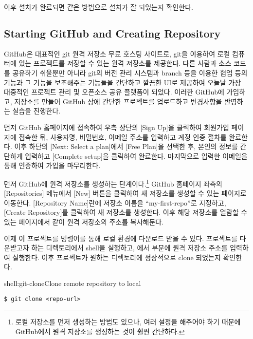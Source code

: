 이후 설치가 완료되면 \과 같은 방법으로 설치가 잘 되었는지 확인한다.
\newpage

\subsection*{Starting GitHub and Creating Repository}

GitHub은 대표적인 git 원격 저장소 무료 호스팅 사이트로, git을 이용하여 로컬 컴퓨터에 있는 프로젝트를 저장할 수 있는 원격 저장소를 제공한다. 다른 사람과 소스 코드를 공유하기 쉬울뿐만 아니라 git의 버전 관리 시스템과 branch 등을 이용한 협업 등의 기능과 그 기능을 보조해주는 기능들을 간단하고 깔끔한 UI로 제공하여 오늘날 가장 대중적인 프로젝트 관리 및 오픈소스 공유 플랫폼이 되었다. 이러한 GitHub에 가입하고, 저장소를 만들어 GitHub 상에 간단한 프로젝트를 업로드하고 변경사항을 반영하는 실습을 진행한다.

먼저 GitHub 홈페이지에 접속하여 우측 상단의 [Sign Up]을 클릭하여 회원가입 페이지에 접속한 뒤, 사용자명, 비밀번호, 이메일 주소를 입력하고 계정 인증 절차를 완료한다. 이후 하단의 [Next: Select a plan]에서 [Free Plan]을 선택한 후, 본인의 정보를 간단하게 입력하고 [Complete setup]을 클릭하여 완료한다. 마지막으로 입력한 이메일을 통해 인증하여 가입을 마무리한다.

먼저 GitHub에 원격 저장소를 생성하는 단계이다.\footnote{로컬 저장소를 먼저 생성하는 방법도 있으나, 여러 설정을 해주어야 하기 때문에 GitHub에서 원격 저장소를 생성하는 것이 훨씬 간단하다.} GitHub 홈페이지 좌측의 [Repositories] 메뉴에서 [New] 버튼을 클릭하여 새 저장소를 생성할 수 있는 페이지로 이동한다. [Repository Name]란에 저장소 이름을 ``my-first-repo''로 지정하고, [Create Repository]를 클릭하여 새 저장소를 생성한다. 이후 해당 저장소를 열람할 수 있는 페이지에서 \과 같이 원격 저장소의 주소를 복사해둔다.


이제 이 프로젝트를  명령어를 통해 로컬 환경에 다운로드 받을 수 있다. 프로젝트를 다운받고자 하는 디렉토리에서 shell을 실행하고, 에서  부분에 원격 저장소 주소를 입력하여 실행한다. 이후 프로젝트가 원하는 디렉토리에 정상적으로 clone 되었는지 확인한다.

\begin{shellenv}{shell:git-clone}{Clone remote repository to local}\begin{verbatim}
$ git clone <repo-url>
\end{verbatim}
\end{shellenv}
\newpage

